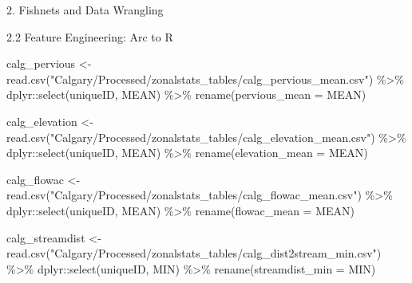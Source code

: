 \documentclass[
  ignorenonframetext,
]{beamer}
\newenvironment{Shaded}{\begin{snugshade}}{\end{snugshade}}
\newcommand{\AttributeTok}[1]{\textcolor[rgb]{0.77,0.63,0.00}{#1}}
\newcommand{\FunctionTok}[1]{\textcolor[rgb]{0.00,0.00,0.00}{#1}}
\newcommand{\NormalTok}[1]{#1}
\newcommand{\OtherTok}[1]{\textcolor[rgb]{0.56,0.35,0.01}{#1}}
\newcommand{\SpecialCharTok}[1]{\textcolor[rgb]{0.00,0.00,0.00}{#1}}
\newcommand{\StringTok}[1]{\textcolor[rgb]{0.31,0.60,0.02}{#1}}
\begin{document}
\begin{frame}[fragile]{2. Fishnets and Data Wrangling}
\begin{block}{2.2 Feature Engineering: Arc to R}
\begin{Shaded}
\begin{Highlighting}[]
\NormalTok{calg\_pervious }\OtherTok{\textless{}{-}} \FunctionTok{read.csv}\NormalTok{(}\StringTok{"Calgary/Processed/zonalstats\_tables/calg\_pervious\_mean.csv"}\NormalTok{) }\SpecialCharTok{\%\textgreater{}\%} 
\NormalTok{  dplyr}\SpecialCharTok{::}\FunctionTok{select}\NormalTok{(uniqueID, MEAN) }\SpecialCharTok{\%\textgreater{}\%} 
  \FunctionTok{rename}\NormalTok{(}\AttributeTok{pervious\_mean =}\NormalTok{ MEAN)}

\NormalTok{calg\_elevation }\OtherTok{\textless{}{-}} \FunctionTok{read.csv}\NormalTok{(}\StringTok{"Calgary/Processed/zonalstats\_tables/calg\_elevation\_mean.csv"}\NormalTok{) }\SpecialCharTok{\%\textgreater{}\%} 
\NormalTok{    dplyr}\SpecialCharTok{::}\FunctionTok{select}\NormalTok{(uniqueID, MEAN) }\SpecialCharTok{\%\textgreater{}\%} 
  \FunctionTok{rename}\NormalTok{(}\AttributeTok{elevation\_mean =}\NormalTok{ MEAN)}

\NormalTok{calg\_flowac }\OtherTok{\textless{}{-}} \FunctionTok{read.csv}\NormalTok{(}\StringTok{"Calgary/Processed/zonalstats\_tables/calg\_flowac\_mean.csv"}\NormalTok{) }\SpecialCharTok{\%\textgreater{}\%} 
\NormalTok{    dplyr}\SpecialCharTok{::}\FunctionTok{select}\NormalTok{(uniqueID, MEAN) }\SpecialCharTok{\%\textgreater{}\%} 
  \FunctionTok{rename}\NormalTok{(}\AttributeTok{flowac\_mean =}\NormalTok{ MEAN)}

\NormalTok{calg\_streamdist }\OtherTok{\textless{}{-}} \FunctionTok{read.csv}\NormalTok{(}\StringTok{"Calgary/Processed/zonalstats\_tables/calg\_dist2stream\_min.csv"}\NormalTok{) }\SpecialCharTok{\%\textgreater{}\%} 
\NormalTok{    dplyr}\SpecialCharTok{::}\FunctionTok{select}\NormalTok{(uniqueID, MIN) }\SpecialCharTok{\%\textgreater{}\%} 
  \FunctionTok{rename}\NormalTok{(}\AttributeTok{streamdist\_min =}\NormalTok{ MIN)}


\end{Highlighting}
\end{Shaded}
\end{block}
\end{frame}
\end{document}
